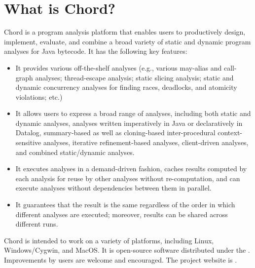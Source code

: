\chapter{What is Chord?}
\label{chap:whatis}

Chord is a program analysis platform that enables users to productively design,
implement, evaluate, and combine a broad variety of static and dynamic program
analyses for Java bytecode. It has the following key features:

\begin{itemize}
\item

It provides various off-the-shelf analyses (e.g., various may-alias and
call-graph analyses; thread-escape analysis; static slicing analysis; static and
dynamic concurrency analyses for finding races, deadlocks, and atomicity
violations; etc.)

\item

It allows users to express a broad range of analyses, including both static and
dynamic analyses, analyses written imperatively in Java or declaratively in
Datalog, summary-based as well as cloning-based inter-procedural
context-sensitive analyses, iterative refinement-based analyses, client-driven
analyses, and combined static/dynamic analyses.

\item

It executes analyses in a demand-driven fashion, caches results computed by each
analysis for reuse by other analyses without re-computation, and can execute
analyses without dependencies between them in parallel.

\item

It guarantees that the result is the same regardless of the order in which
different analyses are executed; moreover, results can be shared across
different runs.
\end{itemize}

Chord is intended to work on a variety of platforms, including Linux,
Windows/Cygwin, and MacOS.  It is open-source software distributed under
the \bsdlicense.  Improvements by users are welcome and encouraged.  The project
website is \chordweb.
